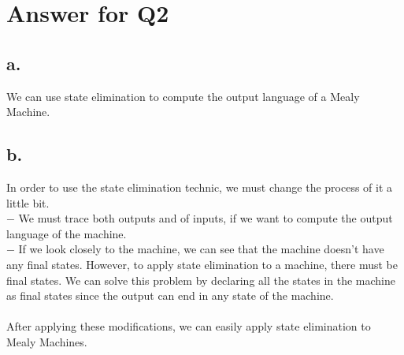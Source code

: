 \documentclass[12pt]{article}
\begin{document}
\section*{Answer for Q2}
\subsection*{a.} 
We can use state elimination to compute the output language of a Mealy Machine.

 \subsection*{b.} 

In order to use the state elimination technic, we must change the process of it a little bit.\\
$-$ We must trace both outputs and of inputs, if we want to compute the output language of the machine.\\
$-$ If we look closely to the machine, we can see that the machine doesn't have any final states. However, to apply state elimination to a machine, there must be final states. We can solve this problem by declaring all the states in the machine as final states since the output can end in any state of the machine.\\
\\
After applying these modifications, we can easily apply state elimination to Mealy Machines. 
\end{document}
